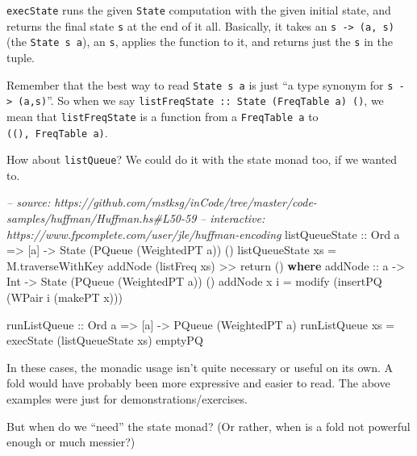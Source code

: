 \documentclass[]{article}
\newenvironment{Shaded}{}{}
\newcommand{\KeywordTok}[1]{\textcolor[rgb]{0.00,0.44,0.13}{\textbf{#1}}}
\newcommand{\DataTypeTok}[1]{\textcolor[rgb]{0.56,0.13,0.00}{#1}}
\newcommand{\CommentTok}[1]{\textcolor[rgb]{0.38,0.63,0.69}{\textit{#1}}}
\newcommand{\OtherTok}[1]{\textcolor[rgb]{0.00,0.44,0.13}{#1}}
\newcommand{\FunctionTok}[1]{\textcolor[rgb]{0.02,0.16,0.49}{#1}}
\newcommand{\NormalTok}[1]{#1}
\begin{document}
\texttt{execState} runs the given \texttt{State} computation with the given
initial state, and returns the final state \texttt{s} at the end of it all.
Basically, it takes an \texttt{s\ -\textgreater{}\ (a,\ s)} (the
\texttt{State\ s\ a}), an \texttt{s}, applies the function to it, and returns
just the \texttt{s} in the tuple.

Remember that the best way to read \texttt{State\ s\ a} is just ``a type synonym
for \texttt{s\ -\textgreater{}\ (a,s)}''. So when we say
\texttt{listFreqState\ ::\ State\ (FreqTable\ a)\ ()}, we mean that
\texttt{listFreqState} is a function from a \texttt{FreqTable\ a} to
\texttt{((),\ FreqTable\ a)}.

How about \texttt{listQueue}? We could do it with the state monad too, if we
wanted to.

\begin{Shaded}
\begin{Highlighting}[]
\CommentTok{-- source: https://github.com/mstksg/inCode/tree/master/code-samples/huffman/Huffman.hs#L50-59}
\CommentTok{-- interactive: https://www.fpcomplete.com/user/jle/huffman-encoding}
\OtherTok{listQueueState ::} \DataTypeTok{Ord}\NormalTok{ a }\OtherTok{=>}\NormalTok{ [a] }\OtherTok{->} \DataTypeTok{State}\NormalTok{ (}\DataTypeTok{PQueue}\NormalTok{ (}\DataTypeTok{WeightedPT}\NormalTok{ a)) ()}
\NormalTok{listQueueState xs }\FunctionTok{=}\NormalTok{ M.traverseWithKey addNode (listFreq xs) }\FunctionTok{>>}\NormalTok{ return ()}
  \KeywordTok{where}
\OtherTok{    addNode ::}\NormalTok{ a }\OtherTok{->} \DataTypeTok{Int} \OtherTok{->} \DataTypeTok{State}\NormalTok{ (}\DataTypeTok{PQueue}\NormalTok{ (}\DataTypeTok{WeightedPT}\NormalTok{ a)) ()}
\NormalTok{    addNode x i }\FunctionTok{=}\NormalTok{ modify (insertPQ (}\DataTypeTok{WPair}\NormalTok{ i (makePT x)))}

\OtherTok{runListQueue ::} \DataTypeTok{Ord}\NormalTok{ a }\OtherTok{=>}\NormalTok{ [a] }\OtherTok{->} \DataTypeTok{PQueue}\NormalTok{ (}\DataTypeTok{WeightedPT}\NormalTok{ a)}
\NormalTok{runListQueue xs }\FunctionTok{=}\NormalTok{ execState (listQueueState xs) emptyPQ}
\end{Highlighting}
\end{Shaded}

In these cases, the monadic usage isn't quite necessary or useful on its own. A
fold would have probably been more expressive and easier to read. The above
examples were just for demonstrations/exercises.

But when do we ``need'' the state monad? (Or rather, when is a fold not powerful
enough or much messier?)
\end{document}
